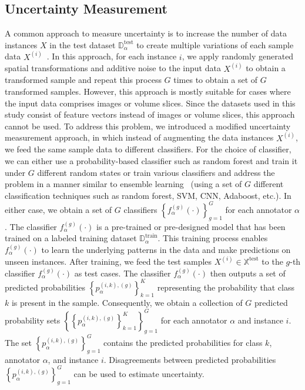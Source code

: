 \subsection{Uncertainty Measurement}\label{subsec:crowd.uncertainty}
A common approach to measure uncertainty is to increase the number of data instances $X $ in the test dataset $\mathbb{D}_\alpha^{\mathrm{test}} $ to create multiple variations of each sample data $X^{(i)} $~\cite{ayhan_TestTime_2018}. In this approach, for each instance $i $, we apply randomly generated spatial transformations and additive noise to the input data $X^{(i)} $ to obtain a transformed sample and repeat this process $G $ times to obtain a set of $G $ transformed samples.
However, this approach is mostly suitable for cases where the input data comprises images or volume slices. Since the datasets used in this study consist of feature vectors instead of images or volume slices, this approach cannot be used. To address this problem, we introduced a modified uncertainty measurement approach, in which instead of augmenting the data instances $X^{(i)} $, we feed the same sample data to different classifiers.
For the choice of classifier, we can either use a probability-based classifier such as random forest and train it under $G $ different random states or train various classifiers and address the problem in a manner similar to ensemble learning~\cite{zhou_Ensemblelearning_2009} (using a set of $G $ different classification techniques such as random forest, SVM, CNN, Adaboost, etc.). In either case, we obtain a set of $G $ classifiers ${\left\{f_{\alpha}^{(g)}( \cdot)\right\}}_{g=1}^G $ for each annotator $\alpha $. The classifier $f_{\alpha}^{(g)}( \cdot) $ is a pre-trained or pre-designed model that has been trained on a labeled training dataset $\mathbb{D}_\alpha^{\mathrm{train}} $. This training process enables $f_{\alpha}^{(g)}(\cdot) $ to learn the underlying patterns in the data and make predictions on unseen instances.
After training, we feed the test samples $X^{(i)}\in \mathbb{X}^{\text{test}} $ to the $g $-th classifier $f_{\alpha}^{(g)}(\cdot) $ as test cases. The classifier $f_{\alpha}^{(g)}(\cdot) $ then outputs a set of predicted probabilities ${\left\{p_{\alpha}^{(i,k),(g)}\right\}}_{k=1}^{K} $ representing the probability that class $k $ is present in the sample. Consequently, we obtain a collection of $G $ predicted probability sets ${\left\{ {\left\{ p_{\alpha}^{(i,k),(g)}\right\}}_{k=1}^K \right\}}_{g=1}^G $ for each annotator $\alpha $ and instance $i $. The set ${\left\{p_{\alpha}^{(i,k),(g)}\right\}}_{g=1}^G $ contains the predicted probabilities for class $k $, annotator $\alpha $, and instance $i $. Disagreements between predicted probabilities ${\left\{p_{\alpha}^{(i,k),(g)}\right\}}_{g=1}^G $ can be used to estimate uncertainty.
